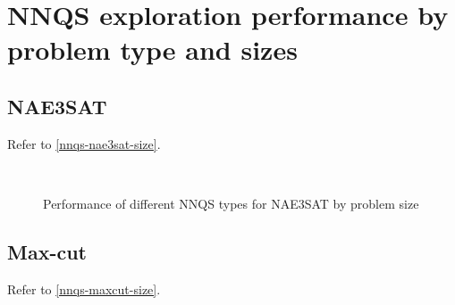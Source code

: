 \chapter{NNQS exploration performance by problem type and sizes}\label{appendix:nnqssizegraph}

\section{NAE3SAT}
Refer to \autoref{nnqs-nae3sat-size}.

\begin{figure}[!htb]
    \centering
    \\
    \caption{Performance of different NNQS types for NAE3SAT by problem size}
    \label{nnqs-nae3sat-size}
\end{figure}

\section{Max-cut}
Refer to \autoref{nnqs-maxcut-size}.

